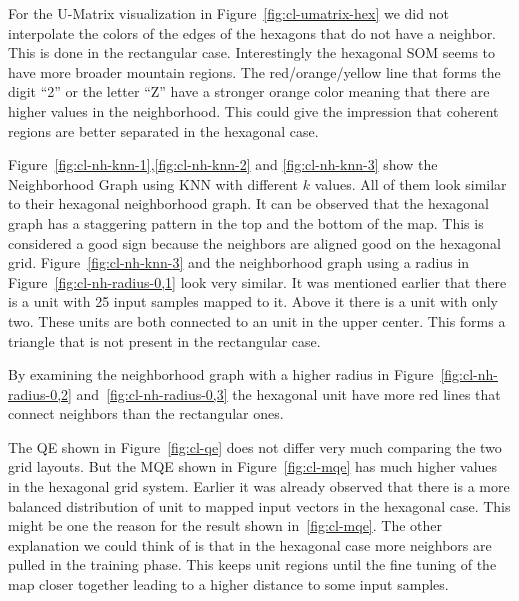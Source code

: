 \documentclass{acm_proc_article-sp}
\begin{document}
For the U-Matrix visualization in Figure~\ref{fig:cl-umatrix-hex} we did not interpolate the colors
of the edges of the hexagons that do not have a neighbor. This is done in the rectangular case. Interestingly the hexagonal SOM seems to have more broader mountain regions. The red/orange/yellow line that forms the digit ``2'' or the letter ``Z'' have a stronger orange color meaning that there are higher values in the neighborhood. This could give the impression that coherent regions are better separated in the hexagonal case.


Figure~\ref{fig:cl-nh-knn-1},\ref{fig:cl-nh-knn-2} and \ref{fig:cl-nh-knn-3} show the Neighborhood Graph using KNN with different $k$ values. All of them look similar to their hexagonal neighborhood graph. It can be observed that the hexagonal graph has a staggering pattern in the top and the bottom of the map.
This is considered a good sign because the neighbors are aligned good on the hexagonal grid.
Figure~\ref{fig:cl-nh-knn-3} and the neighborhood graph using a radius in Figure~\ref{fig:cl-nh-radius-0,1} look very similar.  It was mentioned earlier that there is a unit with 25 input samples mapped to it. Above it there is a unit with only two. These units are both connected to an unit in the upper center. This forms a triangle that is not present in the rectangular case.

By examining the neighborhood graph with a higher radius in Figure~\ref{fig:cl-nh-radius-0,2} and~\ref{fig:cl-nh-radius-0,3} the hexagonal unit have more red lines that connect neighbors than the rectangular ones.


The QE shown in Figure~\ref{fig:cl-qe} does not differ very much comparing the two grid layouts.
But the MQE shown in Figure~\ref{fig:cl-mqe} has much higher values in the hexagonal grid system. Earlier it was already observed that there is a more balanced distribution of unit to mapped input vectors in the hexagonal case. This might be one the reason for the result shown in~\ref{fig:cl-mqe}. The other explanation we could think of is that in the hexagonal case more neighbors are pulled in the training phase. This keeps unit regions until the fine tuning of the map closer together leading to a higher distance to some input samples.
\end{document}
